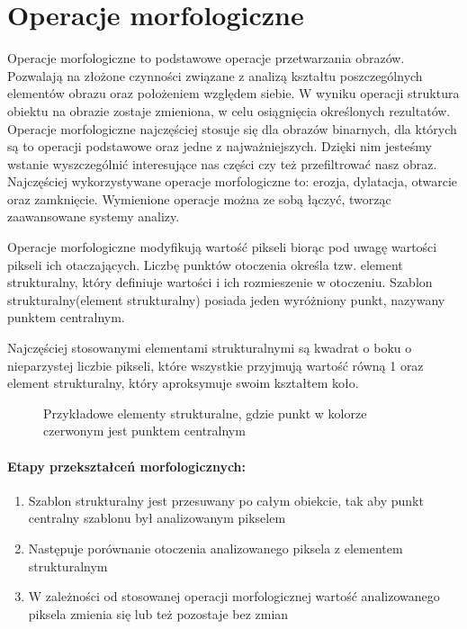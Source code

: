 \documentclass[a4paper,12pt,twoside,openany]{report}
\newcommand{\ImgPath}{.}
\begin{document}
\section{Operacje morfologiczne}
Operacje morfologiczne to podstawowe operacje przetwarzania obrazów. Pozwalają na złożone czynności związane z analizą kształtu poszczególnych elementów obrazu oraz położeniem względem siebie. W wyniku operacji struktura obiektu na obrazie zostaje zmieniona, w celu osiągnięcia określonych rezultatów. 
Operacje morfologiczne najczęściej stosuje się dla obrazów binarnych, dla których są to operacji podstawowe oraz jedne z najważniejszych. Dzięki nim jesteśmy wstanie wyszczególnić interesujące nas części czy też przefiltrować nasz obraz. Najczęściej wykorzystywane operacje morfologiczne to: erozja, dylatacja, otwarcie oraz zamknięcie. Wymienione operacje można ze sobą łączyć, tworząc zaawansowane systemy analizy.

Operacje morfologiczne modyfikują wartość pikseli biorąc pod uwagę wartości pikseli ich otaczających. Liczbę punktów otoczenia określa tzw. element strukturalny, który definiuje wartości i ich rozmieszenie w otoczeniu. Szablon strukturalny(element strukturalny) posiada jeden wyróżniony punkt, nazywany punktem centralnym.

Najczęściej stosowanymi elementami strukturalnymi są kwadrat o boku o nieparzystej liczbie pikseli, które wszystkie przyjmują wartość równą 1 oraz element strukturalny, który aproksymuje swoim kształtem koło.

\begin{figure}[H]
	\centering
	\caption{Przykładowe elementy strukturalne, gdzie punkt w kolorze czerwonym jest punktem centralnym}
\end{figure}

\paragraph{Etapy przekształceń morfologicznych:}
\begin{enumerate}
	\item Szablon strukturalny jest przesuwany po całym obiekcie, tak aby punkt centralny szablonu był analizowanym pikselem
	\item Następuje porównanie otoczenia analizowanego piksela z elementem strukturalnym
	\item W zależności od stosowanej operacji morfologicznej wartość analizowanego piksela zmienia się lub też pozostaje bez zmian
\end{enumerate}
\end{document}
